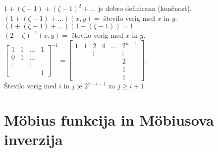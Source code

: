 \documentclass[a4paper, 12pt]{book}
\theoremstyle{definition}
\theoremstyle{remark}
\begin{document}
$\underline{1} + (\zeta-1) + (\zeta-1)^2 + \dots$ je dobro definirana (končnost). \\
$(1 + (\zeta-1) + \dots)(x,y) =$ število verig med $x$ in $y$. \\
$(1 + (\zeta-1) + \dots) (1-(\zeta-1)) = 1$ \\
$(2 - \zeta)^{-1}(x,y) =$ število verig med $x$ in $y$. \\
$\begin{bmatrix}
  1 & 1 & \dots & 1 \\
  0 & 1 & \dots & \\
  \vdots & & \vdots & \\
  & & & 1
\end{bmatrix}^{-1} = \begin{bmatrix}
  1 & 1 & 2 & 4 & \dots & 2^{n-1} \\
  & & \vdots & & & \vdots \\
  & & & & & 2 \\
  & & & & & 1 \\
  & & & & & 1
\end{bmatrix}$. \\
Število verig med $i$ in $j$ je $2^{j-i-1}$ za $j \geq i+1$.


\section{Möbius funkcija in Möbiusova inverzija}
\end{document}
